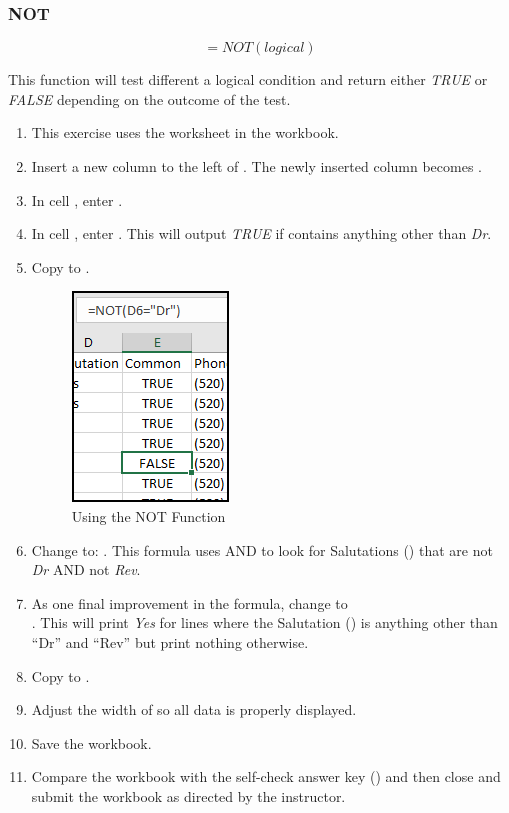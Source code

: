 \subsubsection{NOT}

\[ =NOT(logical) \]

This function will test different a logical condition and return either \textit{TRUE} or \textit{FALSE} depending on the outcome of the test.

\begin{enumbox}
	\begin{enumerate}
		\item This exercise uses the  worksheet in the  workbook.
		\item Insert a new column to the left of . The newly inserted column becomes .
		\item In cell , enter .
		\item In cell , enter . This will output \textit{TRUE} if  contains anything other than \textit{Dr}. 
		\item Copy  to .
		
		\begin{figure}[H]
			\centering
			\includegraphics[width=\maxwidth{.40\linewidth}]{gfx/ch09_fig48}
			\caption{Using the NOT Function}
			\label{09:fig48}
		\end{figure}
		
		\item Change  to: . This formula uses AND to look for Salutations () that are not \textit{Dr} AND not \textit{Rev}.
		\item As one final improvement in the formula, change  to  \\. This will print \textit{Yes} for lines where the Salutation () is anything other than ``Dr'' and ``Rev'' but print nothing otherwise.	
		\item Copy  to .
		\item Adjust the width of  so all data is properly displayed.
		\item Save the  workbook.
		\item Compare the workbook with the self-check answer key () and then close and submit the  workbook as directed by the instructor.
	

\end{enumerate}
\end{enumbox}
